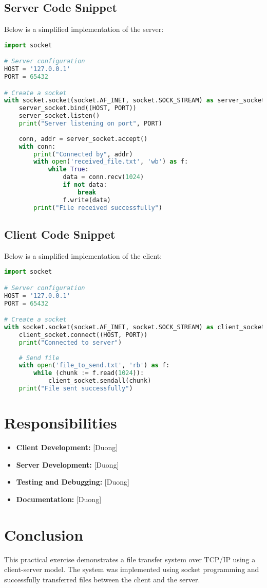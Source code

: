 \documentclass[a4paper,12pt]{article}
\begin{document}
\subsection*{Server Code Snippet}
Below is a simplified implementation of the server:

\begin{lstlisting}[language=Python, caption=Server Code, basicstyle=\ttfamily, keywordstyle=\color{blue}]
import socket

# Server configuration
HOST = '127.0.0.1'
PORT = 65432

# Create a socket
with socket.socket(socket.AF_INET, socket.SOCK_STREAM) as server_socket:
    server_socket.bind((HOST, PORT))
    server_socket.listen()
    print("Server listening on port", PORT)
    
    conn, addr = server_socket.accept()
    with conn:
        print("Connected by", addr)
        with open('received_file.txt', 'wb') as f:
            while True:
                data = conn.recv(1024)
                if not data:
                    break
                f.write(data)
        print("File received successfully")
\end{lstlisting}

\subsection*{Client Code Snippet}
Below is a simplified implementation of the client:

\begin{lstlisting}[language=Python, caption=Client Code, basicstyle=\ttfamily, keywordstyle=\color{blue}]
import socket

# Server configuration
HOST = '127.0.0.1'
PORT = 65432

# Create a socket
with socket.socket(socket.AF_INET, socket.SOCK_STREAM) as client_socket:
    client_socket.connect((HOST, PORT))
    print("Connected to server")
    
    # Send file
    with open('file_to_send.txt', 'rb') as f:
        while (chunk := f.read(1024)):
            client_socket.sendall(chunk)
    print("File sent successfully")
\end{lstlisting}

\section*{Responsibilities}
\begin{itemize}
    \item \textbf{Client Development:} [Duong]
    \item \textbf{Server Development:} [Duong]
    \item \textbf{Testing and Debugging:} [Duong]
    \item \textbf{Documentation:} [Duong]
\end{itemize}

\section*{Conclusion}
This practical exercise demonstrates a file transfer system over TCP/IP using a client-server model. The system was implemented using socket programming and successfully transferred files between the client and the server.
\end{document}
